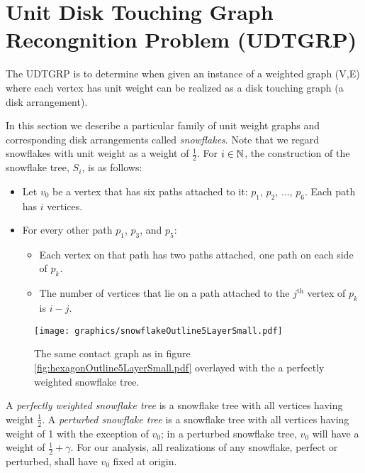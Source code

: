 \section{Unit Disk Touching Graph Recongnition Problem (UDTGRP)}


The UDTGRP is to determine when given an instance of a weighted graph (V,E) where each vertex has unit weight can be realized as a disk touching graph (a disk arrangement).  

In this section we describe a particular family of unit weight graphs and corresponding disk arrangements called \textit{snowflakes}.  
Note that we regard snowflakes with unit weight as a weight of $\frac{1}{2}$.  
For $i \in {\mathbb{N}}$, the construction of the snowflake tree, $S_i$, is as follows:
\begin{itemize}
\item Let $v_0$ be a vertex that has six paths attached to it: $p_1$, $p_2$, $\dots$, $p_6$.  Each path has $i$ vertices.
\item For every other path $p_1$, $p_3$, and $p_5$: 
	\begin{itemize}
		\item 	Each vertex on that path has two paths attached, one path on each side of $p_k$.
		\item	The number of vertices that lie on a path attached to the $j^\text{th}$ vertex of $p_k$ is $i-j$.
	\end{itemize}
\end{itemize}

\begin{figure}[!htbp]
\begin{center}
\texttt{[image: graphics/snowflakeOutline5LayerSmall.pdf]}
\caption{The same contact graph as in figure \ref{fig:hexagonOutline5LayerSmall.pdf} overlayed with the a perfectly weighted snowflake tree.}\label{fig:snowflakeOutline5LayerSmall.pdf}
\end{center}
\end{figure}

A \textit{perfectly weighted snowflake tree} is a snowflake tree with all vertices having weight $\frac{1}{2}$.   
A \textit{perturbed snowflake tree} is a snowflake tree with all vertices having weight of 1 with the exception of $v_0$;  in a perturbed snowflake tree, $v_0$ will have a weight of $\frac{1}{2} + \gamma$.  
For our analysis, all realizations of any snowflake, perfect or perturbed, shall have $v_0$ fixed at origin.  

